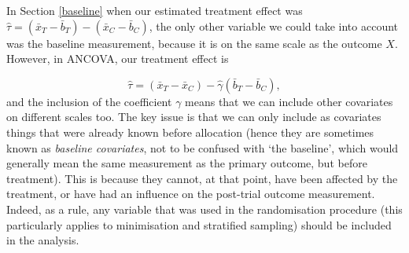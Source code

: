 \documentclass[
  openany]{book}
\theoremstyle{definition}
\theoremstyle{definition}
\theoremstyle{definition}
\theoremstyle{definition}
\theoremstyle{remark}
\begin{document}
In Section \ref{baseline} when our estimated treatment effect was \(\hat\tau = \left(\bar{x}_T - \bar{b}_T\right) - \left(\bar{x}_C - \bar{b}_C\right)\), the only other variable we could take into account was the baseline measurement, because it is on the same scale as the outcome \(X\). However, in ANCOVA, our treatment effect is

\[ \hat\tau = \left(\bar{x}_T - \bar{x}_C\right) - \hat\gamma\left(\bar{b}_T - \bar{b}_C\right), \]
and the inclusion of the coefficient \(\gamma\) means that we can include other covariates on different scales too. The key issue is that we can only include as covariates things that were already known before allocation (hence they are sometimes known as \emph{baseline covariates}, not to be confused with `the baseline', which would generally mean the same measurement as the primary outcome, but before treatment). This is because they cannot, at that point, have been affected by the treatment, or have had an influence on the post-trial outcome measurement. Indeed, as a rule, any variable that was used in the randomisation procedure (this particularly applies to minimisation and stratified sampling) should be included in the analysis.
\end{document}
